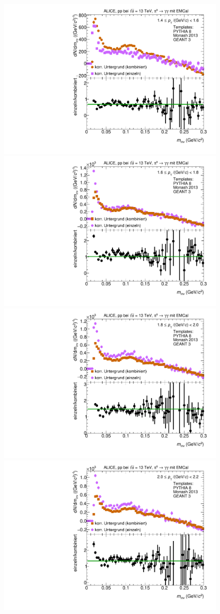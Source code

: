 \begin{figure}[t]
\centering
\begin{multicols}{2}
    \includegraphics[width=.65\linewidth]{Anhang/BackgroundWithRatio01_Data_2016.pdf}\par 
    \includegraphics[width=.65\linewidth]{Anhang/BackgroundWithRatio02_Data_2016.pdf}\par 
\end{multicols}
\begin{multicols}{2}
    \includegraphics[width=.65\linewidth]{Anhang/BackgroundWithRatio03_Data_2016.pdf}\par
    \includegraphics[width=.65\linewidth]{Anhang/BackgroundWithRatio04_Data_2016.pdf}\par

\end{multicols}
\end{figure}
